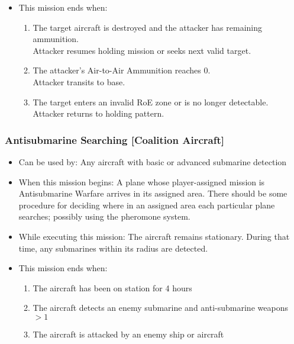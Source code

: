 \documentclass{article}
\begin{document}
\begin{itemize}
            \item This mission ends when:
            \begin{enumerate}[label=\arabic*)]
                \item The target aircraft is destroyed and the attacker has remaining ammunition. \\
                      Attacker resumes holding mission or seeks next valid target.
                \item The attacker’s Air-to-Air Ammunition reaches 0. \\
                      Attacker transits to base.
                \item The target enters an invalid RoE zone or is no longer detectable. \\
                      Attacker returns to holding pattern.
            \end{enumerate}
        \end{itemize}

            
    \subsubsection{Antisubmarine Searching [Coalition Aircraft]}
            \begin{itemize}
                \item Can be used by: Any aircraft with basic or advanced submarine detection
                \item When this mission begins: A plane whose player-assigned mission is Antisubmarine Warfare arrives in its assigned area. There should be some procedure for deciding where in an assigned area each particular plane searches; possibly using the pheromone system.
                \item While executing this mission: The aircraft remains stationary. During that time, any submarines within its radius are detected.
                \item This mission ends when:
                \begin{enumerate}[label=\arabic*)]
                    \item The aircraft has been on station for 4 hours \par
                    [Aircraft begins mission Return to Base]
                    \item The aircraft detects an enemy submarine and anti-submarine weapons $>1$\par
                    [Aircraft mission becomes Attacking Submarine]
                    \item The aircraft is attacked by an enemy ship or aircraft \par
                    [Aircraft begins mission Return to Base]
                \end{enumerate}
            \end{itemize}
\end{document}
